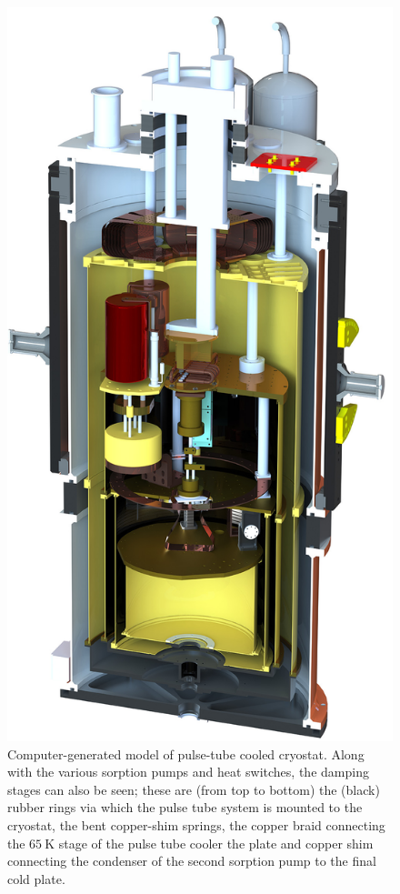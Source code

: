 \begin{figure}[tb]
\begin{center}
\includegraphics[height = 0.5\textheight]{figures/Aloysius1920}
\caption[Computer-generated model of the pulse-tube cooled cryostat]{Computer-generated model of pulse-tube cooled cryostat. Along with the various sorption pumps and heat switches, the damping stages can also be seen; these are (from top to bottom) the (black) rubber rings via which the pulse tube system is mounted to the cryostat, the bent copper-shim springs, the copper braid connecting the $65~\mathrm{K}$ stage of the pulse tube cooler the plate and copper shim connecting the condenser of the second  sorption pump to the final cold plate.}
\label{fig:Aloysius}
\end{center}
\end{figure}
